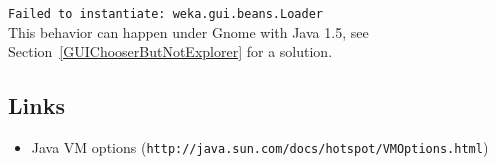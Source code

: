 \verb=Failed to instantiate: weka.gui.beans.Loader=\\

\noindent This behavior can happen under Gnome with Java 1.5, see
Section~\ref{GUIChooserButNotExplorer} for a solution.

\subsection{Links}
\begin{itemize}
\item Java VM options (\verb=http://java.sun.com/docs/hotspot/VMOptions.html=)
\end{itemize}


